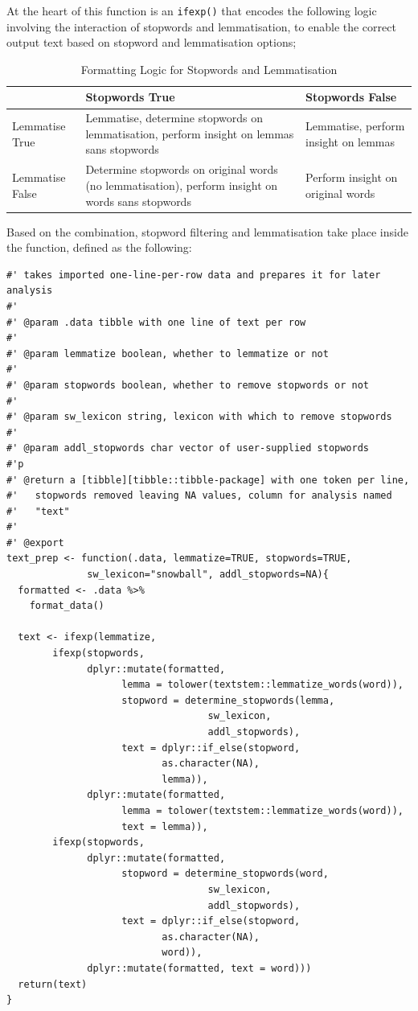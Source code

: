 \documentclass[11pt, a4paper, oneside]{report}
\begin{document}
At the heart of this function is an \texttt{ifexp()} that
encodes the following logic involving the interaction of stopwords and
lemmatisation, to enable the correct output text based on stopword and
lemmatisation options;

\begin{table}[h]
  \centering
  \begin{tabular}{p{20mm}|p{50mm}p{50mm}}
  & Stopwords True & Stopwords False\\
  \toprule
Lemmatise True & Lemmatise, determine stopwords on lemmatisation, perform insight on lemmas sans stopwords & Lemmatise, perform insight on lemmas\\
Lemmatise False & Determine stopwords on original words (no lemmatisation), perform insight on words sans stopwords & Perform insight on original words\\
\end{tabular}

\caption{Formatting Logic for Stopwords and Lemmatisation}\label{tab:formatting}
\end{table}



Based on the combination, stopword filtering and lemmatisation take
place inside the function, defined as the following:

\begin{verbatim}
#' takes imported one-line-per-row data and prepares it for later analysis
#'
#' @param .data tibble with one line of text per row
#'
#' @param lemmatize boolean, whether to lemmatize or not
#'
#' @param stopwords boolean, whether to remove stopwords or not
#'
#' @param sw_lexicon string, lexicon with which to remove stopwords
#'
#' @param addl_stopwords char vector of user-supplied stopwords
#'p
#' @return a [tibble][tibble::tibble-package] with one token per line,
#'   stopwords removed leaving NA values, column for analysis named
#'   "text"
#'
#' @export
text_prep <- function(.data, lemmatize=TRUE, stopwords=TRUE,
		      sw_lexicon="snowball", addl_stopwords=NA){
  formatted <- .data %>%
    format_data()

  text <- ifexp(lemmatize,
		ifexp(stopwords,
		      dplyr::mutate(formatted,
				    lemma = tolower(textstem::lemmatize_words(word)),
				    stopword = determine_stopwords(lemma,
								   sw_lexicon,
								   addl_stopwords),
				    text = dplyr::if_else(stopword,
						   as.character(NA),
						   lemma)),
		      dplyr::mutate(formatted,
				    lemma = tolower(textstem::lemmatize_words(word)),
				    text = lemma)),
		ifexp(stopwords,
		      dplyr::mutate(formatted,
				    stopword = determine_stopwords(word,
								   sw_lexicon,
								   addl_stopwords),
				    text = dplyr::if_else(stopword,
						   as.character(NA),
						   word)),
		      dplyr::mutate(formatted, text = word)))
  return(text)
}
\end{verbatim}
\end{document}
